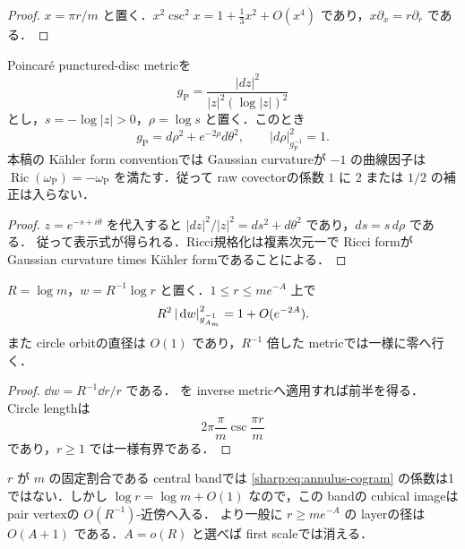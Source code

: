 \documentclass[a4paper,11pt]{ltjsarticle}
\numberwithin{equation}{section}
\theoremstyle{plain}
\theoremstyle{definition}
\theoremstyle{remark}
\newcommand{\Ric}{\operatorname{Ric}}\newcommand{\tr}{\operatorname{tr}}\newcommand{\osc}{\operatorname{osc}}\newcommand{\vol}{\operatorname{Vol}}
\begin{document}
\begin{proof}
$x=\pi r/m$ と置く．$x^2\csc^2x=1+\frac13x^2+O(x^4)$ であり，$x\partial_x=r\partial_r$ である．
\end{proof}

\begin{lemma}\label{sharp:lem:poincare-horospherical-normalization}
Poincar\'e punctured-disc metricを
\[
 g_{\mathrm P}=\frac{|dz|^2}{|z|^2(\log|z|)^2}
\]
とし，$s=-\log|z|>0$，$\rho=\log s$ と置く．このとき
\[
 g_{\mathrm P}=d\rho^2+e^{-2\rho}d\theta^2,
 \qquad |d\rho|_{g_{\mathrm P}^{-1}}^2=1.
\]
本稿の K\"ahler form conventionでは Gaussian curvatureが $-1$ の曲線因子は
$\Ric(\omega_{\mathrm P})=-\omega_{\mathrm P}$ を満たす．従って raw covectorの係数 $1$ に $2$ または $1/2$ の補正は入らない．
\end{lemma}

\begin{proof}
$z=e^{-s+i\theta}$ を代入すると $|dz|^2/|z|^2=ds^2+d\theta^2$ であり，$ds=s\,d\rho$ である．
従って表示式が得られる．Ricci規格化は複素次元一で Ricci formが Gaussian curvature times K\"ahler formであることによる．
\end{proof}

\begin{proposition}\label{sharp:prop:annulus-cogram}
$R=\log m$，$w=R^{-1}\log r$ と置く．$1\le r\le me^{-A}$ 上で
\begin{equation}\label{sharp:eq:annulus-cogram}
 R^2\left\lvert \,\mathrm d w\right\rvert_{g_{A_m}^{-1}}^2
 =1+O(e^{-2A}).
\end{equation}
また circle orbitの直径は $O(1)$ であり，$R^{-1}$ 倍した metricでは一様に零へ行く．
\end{proposition}

\begin{proof}
$\dd w=R^{-1}\dd r/r$ である． を inverse metricへ適用すれば前半を得る．
Circle lengthは
\[
 2\pi\frac{\pi}{m}\csc\frac{\pi r}{m}
\]
であり，$r\ge1$ では一様有界である．
\end{proof}

\begin{remark}
$r$ が $m$ の固定割合である central bandでは \eqref{sharp:eq:annulus-cogram} の係数は1ではない．しかし
$\log r=\log m+O(1)$ なので，この bandの cubical imageは pair vertexの $O(R^{-1})$-近傍へ入る．
より一般に $r\ge me^{-A}$ の layerの径は $O(A+1)$ である．$A=o(R)$ と選べば first scaleでは消える．
\end{remark}
\end{document}

